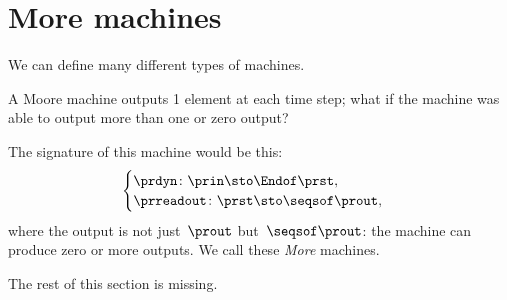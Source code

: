 
\section{More machines}
\label{sec:more-machines}

We can define many different types of machines.

A Moore machine outputs 1 element at each time step; what if the machine was able to output more than one or zero output?

The signature of this machine would be this:
%
\begin{equation}
	\label{eq:more-signature}
	\begin{cases}
		\prdyn \colon  \prin \sto \Endof \prst, \\
		\prreadout \colon \prst \sto \seqsof \prout,
	\end{cases}
\end{equation}
%
where the output is not just~$\prout$ but~$\seqsof \prout$: the machine can produce zero or more outputs.
We call these \emph{More} machines.


\begin{publictodo}
	The rest of this section is missing.
\end{publictodo}

